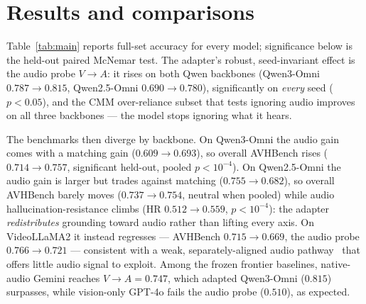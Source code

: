 \documentclass{article}
\begin{document}
\section{Results and comparisons}
\label{sec:results}
Table~\ref{tab:main} reports full-set accuracy for every model; significance below is the held-out paired
McNemar test. The adapter's robust, seed-invariant effect is the audio probe $V\!\to\!A$: it rises on both
Qwen backbones (Qwen3-Omni $0.787\to0.815$, Qwen2.5-Omni $0.690\to0.780$), significantly on \emph{every}
seed ($p<0.05$), and the CMM over-reliance subset that tests ignoring audio improves on all three
backbones --- the model stops ignoring what it hears.

The benchmarks then diverge by backbone. On Qwen3-Omni the audio gain comes with a matching gain
($0.609\to0.693$), so overall AVHBench rises ($0.714\to0.757$, significant held-out, pooled $p<10^{-4}$).
On Qwen2.5-Omni the audio gain is larger but trades against matching ($0.755\to0.682$), so overall AVHBench
barely moves ($0.737\to0.754$, neutral when pooled) while audio hallucination-resistance climbs
(HR $0.512\to0.559$, $p<10^{-4}$): the adapter \emph{redistributes} grounding toward audio rather than
lifting every axis. On VideoLLaMA2 it instead regresses --- AVHBench $0.715\to0.669$, the audio probe
$0.766\to0.721$ --- consistent with a weak, separately-aligned audio pathway~\cite{avllm_seehear,fastav}
that offers little audio signal to exploit. Among the frozen frontier baselines, native-audio Gemini
reaches $V\!\to\!A{=}0.747$, which adapted Qwen3-Omni ($0.815$) surpasses, while vision-only GPT-4o fails
the audio probe ($0.510$), as expected.
\end{document}
